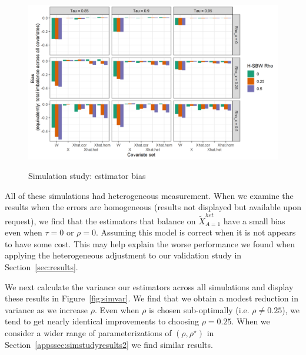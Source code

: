 
\begin{figure}[H]
\begin{center}
    \caption{Simulation study: estimator bias}\label{fig:simbias}
    \label{fig:loveplotc1}
    \includegraphics[scale=0.5]{01_Plots/bias-plot.png}
\end{center}
\end{figure}

All of these simulations had heterogeneous measurement. When we examine the results when the errors are homogeneous (results not displayed but available upon request), we find that the estimators that balance on $\tilde{X}^{het}_{A=1}$ have a small bias even when $\tau = 0$ or $\rho = 0$. Assuming this model is correct when it is not appears to have some cost. This may help explain the worse performance we found when applying the heterogeneous adjustment to our validation study in Section~\ref{sec:results}.

We next calculate the variance our estimators across all simulations and display these results in Figure~\ref{fig:simvar}. We find that we obtain a modest reduction in variance as we increase $\rho$. Even when $\rho$ is chosen sub-optimally (i.e. $\rho \ne 0.25$), we tend to get nearly identical improvements to choosing $\rho = 0.25$. When we consider a wider range of parameterizations of $(\rho, \rho^\star)$ in Section~\ref{appssec:simstudyresults2} we find similar results.

